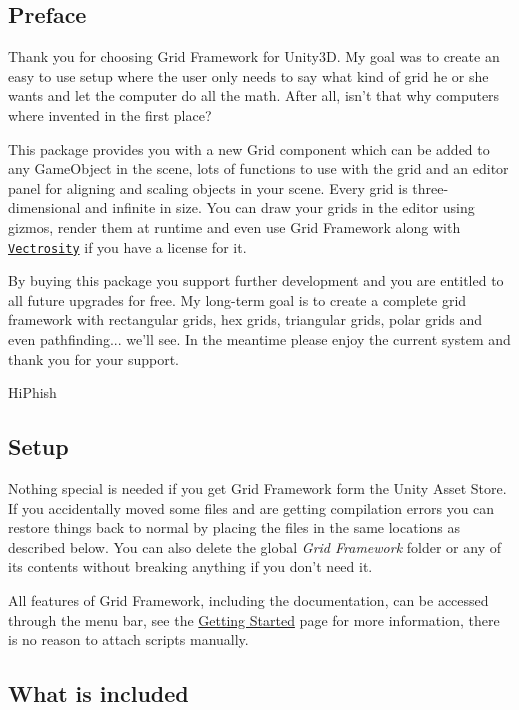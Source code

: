 \subsection*{Preface }

Thank you for choosing Grid Framework for Unity3\+D. My goal was to create an easy to use setup where the user only needs to say what kind of grid he or she wants and let the computer do all the math. After all, isn’t that why computers where invented in the first place?

This package provides you with a new Grid component which can be added to any Game\+Object in the scene, lots of functions to use with the grid and an editor panel for aligning and scaling objects in your scene. Every grid is three-\/dimensional and infinite in size. You can draw your grids in the editor using gizmos, render them at runtime and even use Grid Framework along with \href{http://starscenesoftware.com/vectrosity.html/}{\tt Vectrosity} if you have a license for it.

By buying this package you support further development and you are entitled to all future upgrades for free. My long-\/term goal is to create a complete grid framework with rectangular grids, hex grids, triangular grids, polar grids and even pathfinding... we’ll see. In the meantime please enjoy the current system and thank you for your support.

Hi\+Phish

\subsection*{Setup }

Nothing special is needed if you get Grid Framework form the Unity Asset Store. If you accidentally moved some files and are getting compilation errors you can restore things back to normal by placing the files in the same locations as described below. You can also delete the global {\itshape Grid Framework} folder or any of its contents without breaking anything if you don’t need it.

All features of Grid Framework, including the documentation, can be accessed through the menu bar, see the \hyperlink{getting_started}{Getting Started} page for more information, there is no reason to attach scripts manually.

\subsection*{What is included }

